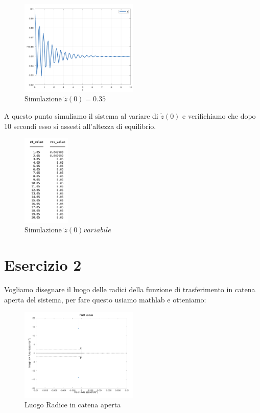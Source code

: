 \documentclass{article}
\newcommand{\spacer}[1][8pt]{
    \par\vspace{#1}
}
\begin{document}
\begin{figure}[H]
    \centering
    \includegraphics[width = 0.5\textwidth]{Images/simulazione-d-0.1.png}
    \caption{Simulazione $\tilde{z}(0)=0.35$}
    \label{fig:simulazione_d_0.1}
\end{figure}

\spacer
A questo punto simuliamo il sistema al variare di $\tilde{z}(0)$ e verifichiamo che dopo 10 secondi esso si assesti all'altezza di equilibrio.

\begin{figure}[H]
    \centering
    \includegraphics[width = 0.2\textwidth]{Images/risultati-simulazioni.png}
    \caption{Simulazione $\tilde{z}(0) variabile$}
    \label{fig:simulazione_z_variabile}
\end{figure}

\section{Esercizio 2}
Vogliamo disegnare il luogo delle radici della funzione di trasferimento in catena aperta del sistema, per fare questo usiamo mathlab e otteniamo:

\begin{figure}[H]
    \centering
    \includegraphics[width = 0.5\textwidth]{Images/luogo-radici-proporzionale.png}
    \caption{Luogo Radice in catena aperta}
    \label{fig:luogo_radice_catena_aperta}
\end{figure}
\end{document}
